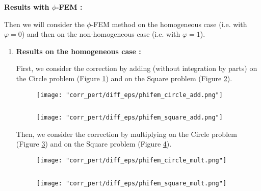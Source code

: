 \textbf{Results with $\phi$-FEM :}

Then we will consider the $\phi$-FEM method on the homogeneous case (i.e. with $\varphi=0$) and then on the non-homogeneous case (i.e. with $\varphi=1$).

\begin{enumerate}[label=\textbullet]
	\item \textbf{Results on the homogeneous case :}
	
	First, we consider the correction by adding (without integration by parts) on the Circle problem (Figure \ref{corr_pert_phifem_circle_add}) and on the Square problem (Figure \ref{corr_pert_phifem_square_add}).
	
	\begin{minipage}{0.48\linewidth}
		\begin{figure}[H]
			\centering
			\texttt{[image: "corr\_pert/diff\_eps/phifem\_circle\_add.png"]}
			\label{corr_pert_phifem_circle_add}
		\end{figure} 
	\end{minipage} $\qquad$
	\begin{minipage}{0.48\linewidth}
		\begin{figure}[H]
			\centering
			\texttt{[image: "corr\_pert/diff\_eps/phifem\_square\_add.png"]}
			\label{corr_pert_phifem_square_add}
		\end{figure} 
	\end{minipage}
	
	Then, we consider the correction by multiplying on the Circle problem (Figure \ref{corr_pert_phifem_circle_mult}) and on the Square problem (Figure \ref{corr_pert_phifem_square_mult}).
	
	\begin{minipage}{0.48\linewidth}
		\begin{figure}[H]
			\centering
			\texttt{[image: "corr\_pert/diff\_eps/phifem\_circle\_mult.png"]}
			\label{corr_pert_phifem_circle_mult}
		\end{figure} 
	\end{minipage} $\qquad$
	\begin{minipage}{0.48\linewidth}
		\begin{figure}[H]
			\centering
			\texttt{[image: "corr\_pert/diff\_eps/phifem\_square\_mult.png"]}
			\label{corr_pert_phifem_square_mult}
		\end{figure} 
	\end{minipage}
	

\end{enumerate}
